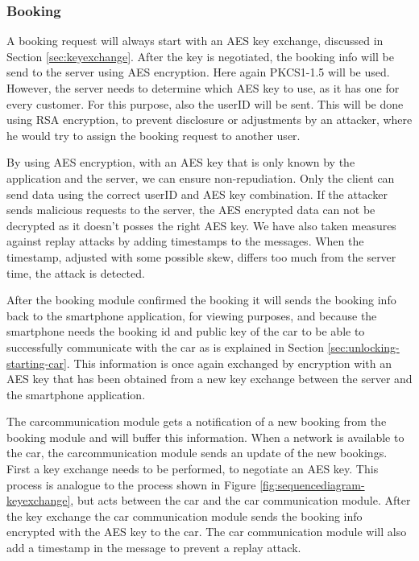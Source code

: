\documentclass[12pt,a4paper, oneside]{article}
\begin{document}
\subsubsection{Booking}\label{sec:booking}

A booking request will always start with an AES key exchange, discussed in Section \ref{sec:keyexchange}. After the key is negotiated, the booking info will be send to the server using AES encryption. Here again PKCS1-1.5 will be used. However, the server needs to determine which AES key to use, as it has one for every customer. For this purpose, also the userID will be sent. This will be done using RSA encryption, to prevent disclosure or adjustments by an attacker, where he would try to assign the booking request to another user. 
\par
By using AES encryption, with an AES key that is only known by the application and the server, we can ensure non-repudiation. Only the client can send data using the correct userID and AES key combination. If the attacker sends malicious requests to the server, the AES encrypted data can not be decrypted as it doesn't posses the right AES key. We have also taken measures against replay attacks by adding timestamps to the messages. When the timestamp, adjusted with some possible skew, differs too much from the server time, the attack is detected.

After the booking module confirmed the booking it will sends the booking info back to the smartphone application, for viewing purposes, and because the smartphone needs the booking id and public key of the car to be able to successfully communicate with the car as is explained in Section \ref{sec:unlocking-starting-car}. This information is once again exchanged by encryption with an AES key that has been obtained from a new key exchange between the server and the smartphone application.

The carcommunication module gets a notification of a new booking from the booking module and will buffer this information. When a network is available to the car, the carcommunication module sends an update of the new bookings. First a key exchange needs to be performed, to negotiate an AES key. This process is analogue to the process shown in Figure \ref{fig:sequencediagram-keyexchange}, but acts between the car and the car communication module. After the key exchange the car communication module sends the booking info encrypted with the AES key to the car. The car communication module will also add a timestamp in the message to prevent a replay attack.
\end{document}
